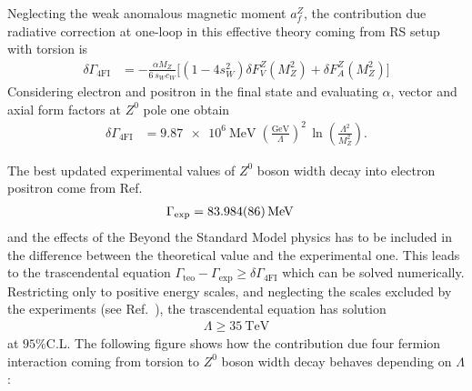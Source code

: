 \documentclass[twocolumn,showpacs,showkeys,prd,superscriptaddress]{revtex4-1}
\begin{document}
Neglecting the weak anomalous magnetic moment $a_f^Z$, the contribution due radiative correction at one-loop in this effective theory coming from RS setup with torsion is
\begin{align}
  \delta\Gamma_{\text{4FI}} &= -\frac{\alpha M_Z}{6\,s_Wc_W}\Bigg[(1 - 4s_W^2)\delta F_V^Z(M_Z^2) + \delta F_A^Z(M_Z^2)\Bigg]
\end{align}
Considering electron and positron in the final state and evaluating $\alpha$, vector and axial form factors at $Z^0$ pole one obtain 
\begin{align}
  \label{deltagammateo}
  \delta\Gamma_{\text{4FI}} &= \SI{9.87e6}{\MeV}\;\left(\frac{\si{\GeV}}{\Lambda}\right)^2\,\ln\left(\frac{\Lambda^2}{M_Z^2}\right).
\end{align}

The best updated experimental values of $Z^0$ boson width decay into electron positron come from Ref.~\cite{Beringer:1900zz}
\begin{align}
  \label{deltagammaexp}
  \Gamma_{\text{exp}} &= \SI{83.984 \pm 0.086}{\MeV} 
\end{align}
and the effects of the Beyond the Standard Model physics has to be included in the difference between the theoretical value and the experimental one. This leads to the trascendental equation $\Gamma_{\text{teo}} - \Gamma_{\text{exp}}\geq \delta\Gamma_{\text{4FI}}$ which can be solved numerically. Restricting only to positive energy scales, and neglecting the scales excluded by the experiments (see Ref.~\cite{Chatrchyan:2013muj}), the trascendental equation has solution
\begin{eqnarray}
  \Lambda \geq \SI{35}{\TeV}
\end{eqnarray}
at $95\%$C.L. The following figure shows how the contribution due four fermion interaction coming from torsion to $Z^0$ boson width decay behaves depending on $\Lambda$ :
\vspace{0.4cm}
\end{document}
